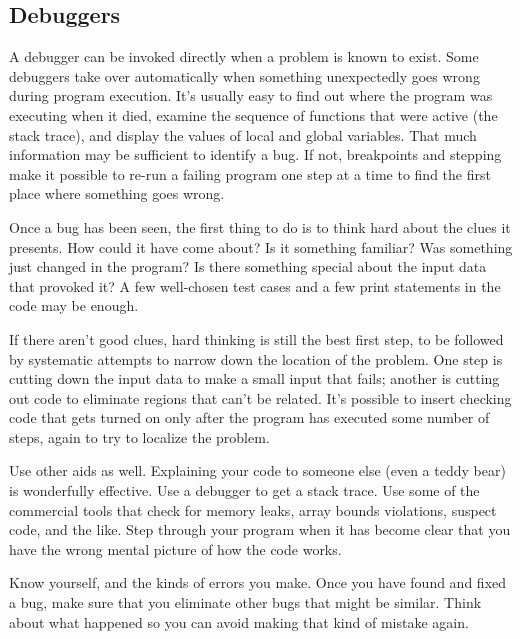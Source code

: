 \documentclass[draftclsnofoot,journal,onecolumn,12pt]{IEEEtran}
\begin{document}
\subsection{Debuggers}
A debugger can be invoked directly when a problem is known to exist. Some debuggers take over automatically when something unexpectedly goes wrong during program execution. It's usually easy to find out where the program was executing when it died, examine the sequence of functions that were active (the stack trace), and display the values of local and global variables. That much information may be sufficient to identify a bug. If not, breakpoints and stepping make it possible to re-run a failing program one step at a time to find the first place where something goes wrong.\cite{kernighan1999practice}

Once a bug has been seen, the first thing to do is to think hard about the clues it presents. How could it have come about? Is it something familiar? Was something just changed in the program? Is there something special about the input data that provoked it? A few well-chosen test cases and a few print statements in the code may be enough.

If there aren't good clues, hard thinking is still the best first step, to be followed by systematic attempts to narrow down the location of the problem. One step is cutting down the input data to make a small input that fails; another is cutting out code to eliminate regions that can't be related. It's possible to insert checking code that gets turned on only after the program has executed some number of steps, again to try to localize the problem.

Use other aids as well. Explaining your code to someone else (even a teddy bear) is wonderfully effective. Use a debugger to get a stack trace. Use some of the commercial tools that check for memory leaks, array bounds violations, suspect code, and the like. Step through your program when it has become clear that you have the wrong mental picture of how the code works.

Know yourself, and the kinds of errors you make. Once you have found and fixed a bug, make sure that you eliminate other bugs that might be similar. Think about what happened so you can avoid making that kind of mistake again.
\end{document}
